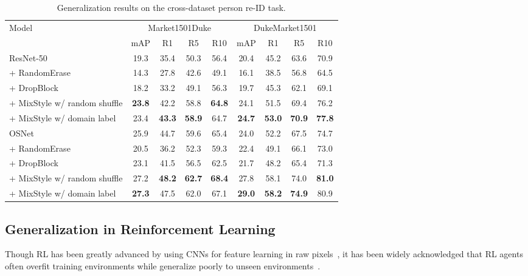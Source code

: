 \documentclass{article} \usepackage{iclr2021_conference,times}
\newcommand{\tableCellHeight}{1}
\newcommand{\tabstyle}[1]{
  \setlength{\tabcolsep}{#1}
  \renewcommand{\arraystretch}{\tableCellHeight}
  \centering
}
\begin{document}
\begin{table}[t]
\tabstyle{6pt}
\caption{Generalization results on the cross-dataset person re-ID task.}
\label{tab:result_reid}
\begin{tabular}{l | c c c c | c c c c}
\hline
\multirow{2}{*}{Model} & \multicolumn{4}{c|}{Market1501Duke} & \multicolumn{4}{c}{DukeMarket1501} \\
& mAP & R1 & R5 & R10 & mAP & R1 & R5 & R10 \\
\hline \hline
ResNet-50 & 19.3 & 35.4	& 50.3 & 56.4 & 20.4 & 45.2 & 63.6 & 70.9 \\
+ RandomErase & 14.3 & 27.8 & 42.6 & 49.1 & 16.1 & 38.5 & 56.8 & 64.5 \\
+ DropBlock & 18.2 & 33.2 & 49.1 & 56.3 & 19.7 & 45.3 & 62.1 & 69.1 \\
+ MixStyle w/ random shuffle & \textbf{23.8} & {42.2} & {58.8} & \textbf{64.8} & {24.1} & {51.5} & {69.4} & {76.2} \\
+ MixStyle w/ domain label & 23.4 & \textbf{43.3} & \textbf{58.9} & 64.7 & \textbf{24.7} & \textbf{53.0} & \textbf{70.9} & \textbf{77.8} \\
\hline
OSNet & 25.9 & 44.7 & 59.6 & 65.4 & 24.0 & 52.2 & 67.5 & 74.7 \\
+ RandomErase & 20.5 & 36.2 & 52.3 & 59.3 & 22.4 & 49.1 & 66.1 & 73.0 \\
+ DropBlock & 23.1 & 41.5 & 56.5 & 62.5 & 21.7 & 48.2 & 65.4 & 71.3 \\
+ MixStyle w/ random shuffle & {27.2} & \textbf{48.2} & \textbf{62.7} & \textbf{68.4} & {27.8} & {58.1} & {74.0} & \textbf{81.0} \\
+ MixStyle w/ domain label & \textbf{27.3} & 47.5 & 62.0 & 67.1 & \textbf{29.0} & \textbf{58.2} & \textbf{74.9} & 80.9 \\
\hline
\end{tabular}
\end{table}


\subsection{Generalization in Reinforcement Learning} \label{sec:experiments:rl}
Though RL has been greatly advanced by using CNNs for feature learning in raw pixels~\citep{mnih2013playing}, it has been widely acknowledged that RL agents often overfit training environments while generalize poorly to unseen environments~\citep{cobbe2019quantifying,igl2019generalization}. 
\end{document}
